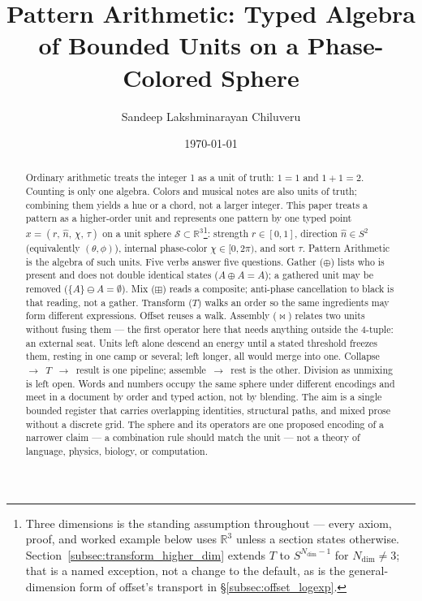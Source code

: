 \documentclass[12pt, a4paper]{article}
\title{Pattern Arithmetic: Typed Algebra of Bounded Units on a Phase-Colored Sphere}
\author{Sandeep Lakshminarayan Chiluveru}
\date{\today}
\begin{document}
\maketitle

\begin{abstract}
Ordinary arithmetic treats the integer 1 as a unit of truth: $1=1$ and $1+1=2$. Counting is only one algebra. Colors and musical notes are also units of truth; combining them yields a hue or a chord, not a larger integer. This paper treats a pattern as a higher-order unit and represents one pattern by one typed point
$x = (r,\,\hat n,\,\chi,\,\tau)$
on a unit sphere $\mathcal{S} \subset \mathbb{R}^3$\footnote{Three
dimensions is the standing assumption throughout --- every axiom,
proof, and worked example below uses $\mathbb{R}^3$ unless a section
states otherwise. Section~\ref{subsec:transform_higher_dim} extends
$T$ to $S^{N_{\mathrm{dim}}-1}$ for $N_{\mathrm{dim}}\ne3$; that is a
named exception, not a change to the default, as is the
general-dimension form of offset's transport in
\S\ref{subsec:offset_logexp}.}:
strength $r \in [0, 1]$,
direction $\hat n \in S^2$ (equivalently $(\theta,\phi)$),
internal phase-color $\chi \in [0, 2\pi)$,
and sort $\tau$.
Pattern Arithmetic is the algebra of such units. Five verbs answer
five questions. Gather ($\oplus$) lists who is present and does not
double identical states ($A \oplus A = A$); a gathered unit may be
removed ($\{A\} \ominus A = \emptyset$). Mix ($\boxplus$) reads a
composite; anti-phase cancellation to black is that reading, not a
gather. Transform ($T$) walks an order so the same ingredients may
form different expressions. Offset reuses a walk. Assembly
($\bowtie$) relates two units without fusing them --- the first
operator here that needs anything outside the 4-tuple: an external
seat. Units left alone descend an energy until a stated threshold
freezes them, resting in one camp or several; left longer, all would
merge into one. Collapse~$\to$~$T$~$\to$~result is
one pipeline; assemble~$\to$~rest is the other. Division as
unmixing is left open. Words and numbers occupy the same sphere under different encodings and meet in a document by order and typed action, not by blending. The aim is a single bounded register that carries overlapping identities, structural paths, and mixed prose without a discrete grid. The sphere and its operators are one proposed encoding of a narrower claim --- a combination rule should match the unit --- not a theory of language, physics, biology, or computation.
\end{abstract}
\end{document}
